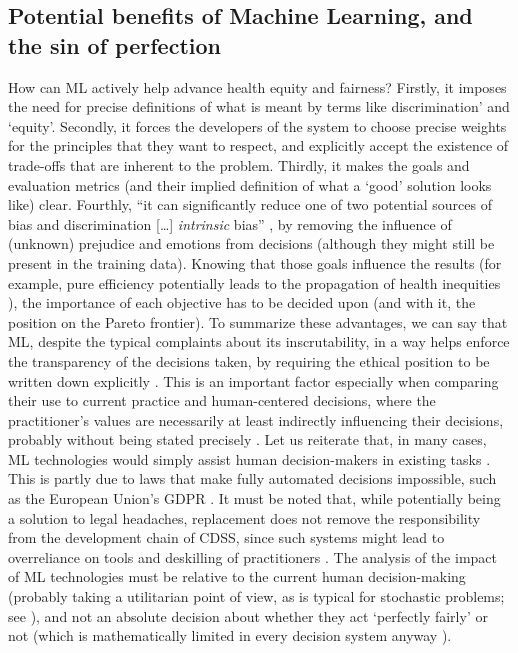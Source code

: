 \subsection{Potential benefits of Machine Learning, and the sin of perfection}
    How can ML actively help advance health equity and fairness?
    Firstly, it imposes the need for precise definitions of what is meant by terms like discrimination' and `equity'.
    Secondly, it forces the developers of the system to choose precise weights for the principles that they want to respect, and explicitly accept the existence of trade-offs that are inherent to the problem.
    Thirdly, it makes the goals and evaluation metrics (and their implied definition of what a `good' solution looks like) clear.
    Fourthly, ``it can significantly reduce one of two potential sources of bias and discrimination [\dots] \emph{intrinsic} bias'' \cite[p.~672]{Zerilli2019}, by removing the influence of (unknown) prejudice and emotions from decisions (although they might still be present in the training data).
    Knowing that those goals influence the results \cite{Dijkstra2020} (for example, pure efficiency potentially leads to the propagation of health inequities \cite{Rajkomar2018}), the importance of each objective has to be decided upon (and with it, the position on the Pareto frontier).
    To summarize these advantages, we can say that ML, despite the typical complaints about its inscrutability, in a way helps enforce the transparency of the decisions taken, by requiring the ethical position to be written down explicitly \cite{Williamson2021}.
    This is an important factor especially when comparing their use to current practice and human-centered decisions, where the practitioner's values are necessarily at least indirectly influencing their decisions, probably without being stated precisely \cite{Zerilli2019}.
    Let us reiterate that, in many cases, ML technologies would simply assist human decision-makers in existing tasks \cite{Morley2020}.
    This is partly due to laws that make fully automated decisions impossible, such as the European Union's GDPR \cite{Zerilli2019}.
    It must be noted that, while potentially being a solution to legal headaches, replacement does not remove the responsibility from the development chain of CDSS, since such systems might lead to overreliance on tools and deskilling of practitioners \cite{Morley2020}.
    The analysis of the impact of ML technologies must be relative to the current human decision-making (probably taking a utilitarian point of view, as is typical for stochastic problems; see \cite{Hardin1989}), and not an absolute decision about whether they act `perfectly fairly' or not (which is mathematically limited in every decision system anyway \cite{Zerilli2019}).
